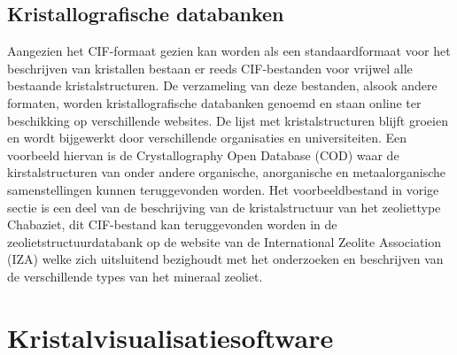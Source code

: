 \subsection{Kristallografische databanken}
Aangezien het CIF-formaat gezien kan worden als een standaardformaat voor het beschrijven van kristallen bestaan er reeds CIF-bestanden voor vrijwel alle bestaande kristalstructuren. De verzameling van deze bestanden, alsook andere formaten, worden kristallografische databanken genoemd en staan online ter beschikking op verschillende websites. De lijst met kristalstructuren blijft groeien en wordt bijgewerkt door verschillende organisaties en universiteiten. Een voorbeeld hiervan is de Crystallography Open Database (COD) waar de kirstalstructuren van onder andere organische, anorganische en metaalorganische samenstellingen kunnen teruggevonden worden. Het voorbeeldbestand in vorige sectie is een deel van de beschrijving van de kristalstructuur van het zeoliettype Chabaziet, dit CIF-bestand kan teruggevonden worden in de zeolietstructuurdatabank op de website van de International Zeolite Association (IZA) welke zich uitsluitend bezighoudt met het onderzoeken en beschrijven van de verschillende types van het mineraal zeoliet.

\section{Kristalvisualisatiesoftware}

